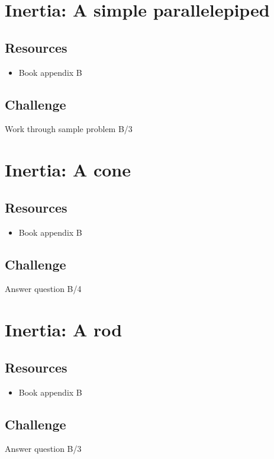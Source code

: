 \newpage
\section{Inertia: A simple parallelepiped}

\subsection*{Resources}
\begin{itemize}
    \item Book appendix B
\end{itemize}

\subsection*{Challenge}
Work through sample problem B/3




\newpage
\section{Inertia: A cone}

\subsection*{Resources}
\begin{itemize}
    \item Book appendix B
\end{itemize}

\subsection*{Challenge}
Answer question B/4




\newpage
\section{Inertia: A rod}

\subsection*{Resources}
\begin{itemize}
    \item Book appendix B
\end{itemize}

\subsection*{Challenge}
Answer question B/3




